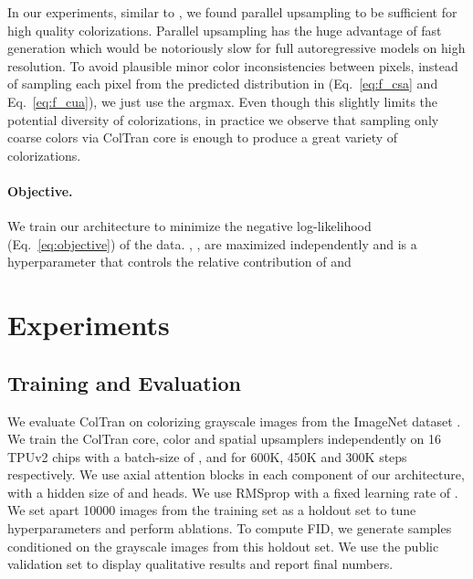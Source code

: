 \documentclass{article} \usepackage{iclr2021_conference,times}
\begin{document}
In our experiments, similar to \citep{guadarrama2017pixcolor}, we found parallel upsampling to be sufficient for high quality colorizations. Parallel upsampling has the huge advantage of fast generation which would be notoriously slow for full autoregressive models on high resolution. To avoid plausible minor color inconsistencies between pixels, instead of sampling each pixel from the predicted distribution in (Eq.~\ref{eq:f_csa} and Eq.~\ref{eq:f_cua}), we just use the argmax. Even though this slightly limits the potential diversity of colorizations, in practice we observe that sampling only coarse colors via ColTran core is enough to produce a great variety of colorizations. 

\paragraph{Objective.} We train our architecture to minimize the negative log-likelihood (Eq.~\ref{eq:objective}) of the data. , ,  are maximized independently and  is a hyperparameter that controls the relative contribution of  and 


\section{Experiments}

\subsection{Training and Evaluation}
We evaluate ColTran on colorizing  grayscale images from the ImageNet dataset \citep{russakovsky2015imagenet}. We train the ColTran core, color and spatial upsamplers independently on 16 TPUv2 chips with a batch-size of ,  and  for 600K, 450K and 300K steps respectively. We use  axial attention blocks in each component of our architecture, with a hidden size of  and  heads. We use RMSprop \citep{tieleman2012lecture} with a fixed learning rate of . We set apart 10000 images from the training set as a holdout set to tune hyperparameters and perform ablations. To compute FID, we generate  samples conditioned on the grayscale images from this holdout set. We use the public validation set to display qualitative results and report final numbers. 
\end{document}
